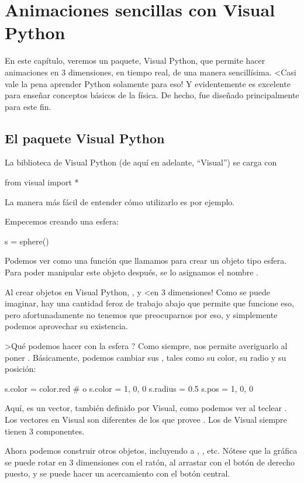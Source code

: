 \chapter{Animaciones sencillas con Visual Python}

En este capítulo, veremos un paquete, Visual Python, que permite hacer animaciones en 3 dimensiones, en tiempo real, de una manera sencillísima. <Casi vale la pena aprender Python solamente para eso! Y evidentemente es excelente para enseñar conceptos básicos de la física. De hecho, fue diseñado principalmente para este fin.

\section{El paquete Visual Python}
La biblioteca de Visual Python (de aquí en adelante, ``Visual'') se carga con
\begin{python}
from visual import *
\end{python}
La manera más fácil de entender cómo utilizarlo es por ejemplo.

Empecemos creando una esfera:
\begin{python}
s = sphere()
\end{python}
Podemos ver  como una función que llamamos para crear un objeto tipo esfera.
Para poder manipular este objeto después, se lo asignamos el nombre .

Al crear objetos en Visual Python, , y <en 3 dimensiones!
Como se puede imaginar, hay una cantidad feroz de trabajo abajo que permite que funcione eso, pero afortunadamente no tenemos que preocuparnos por eso, y simplemente podemos aprovechar su existencia.

>Qué podemos hacer con la esfera ? Como siempre,  nos permite averiguarlo al poner .
Básicamente, podemos cambiar sus , tales como su color, su radio y su posición:
\begin{python}
s.color = color.red	# o  s.color = 1, 0, 0
s.radius = 0.5
s.pos = 1, 0, 0
\end{python}
Aquí,  es un vector, también definido por Visual, como podemos ver al teclear .
Los vectores en Visual son diferentes de los que provee . Los de Visual siempre tienen 3 componentes.

Ahora podemos construir otros objetos, incluyendo a , , etc.
Nótese que la gráfica se puede rotar en 3 dimensiones con el ratón, al arrastar con el botón de derecho puesto, y se puede hacer un acercamiento con el botón central.

